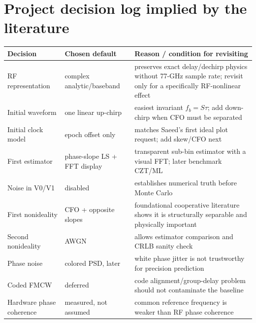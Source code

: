 \documentclass[11pt]{article}
\begin{document}
\section{Project decision log implied by the literature}
\begin{longtable}{@{}p{}p{}p{}@{}}
\toprule Decision & Chosen default & Reason / condition for revisiting \\ \midrule
RF representation & complex analytic/baseband & preserves exact delay/dechirp physics without 77-GHz sample rate; revisit only for a specifically RF-nonlinear effect \\
Initial waveform & one linear up-chirp & easiest invariant $f_b=S\tau$; add down-chirp when CFO must be separated \\
Initial clock model & epoch offset only & matches Saeed's first ideal plot request; add skew/CFO next \\
First estimator & phase-slope LS + FFT display & transparent sub-bin estimator with a visual FFT; later benchmark CZT/ML \\
Noise in V0/V1 & disabled & establishes numerical truth before Monte Carlo \\
First nonideality & CFO + opposite slopes & foundational cooperative literature shows it is structurally separable and physically important \\
Second nonideality & AWGN & allows estimator comparison and CRLB sanity check \\
Phase noise & colored PSD, later & white phase jitter is not trustworthy for precision prediction \\
Coded FMCW & deferred & code alignment/group-delay problem should not contaminate the baseline \\
Hardware phase coherence & measured, not assumed & common reference frequency is weaker than RF phase coherence \\
\bottomrule
\end{longtable}
\end{document}
